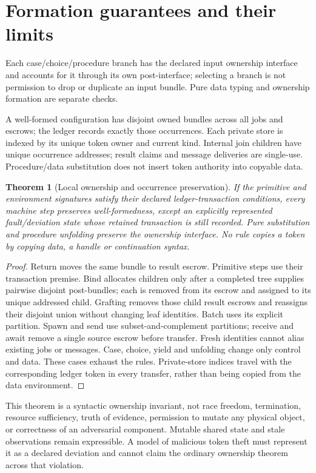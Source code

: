 \documentclass[11pt]{article}
\newtheorem{theorem}{Theorem}\newtheorem{definition}{Definition}\newtheorem{proposition}{Proposition}
\begin{document}
\section{Formation guarantees and their limits}
Each case/choice/procedure branch has the declared input ownership interface and accounts for it through its own post-interface; selecting a branch is not permission to drop or duplicate an input bundle. Pure data typing and ownership formation are separate checks.

A well-formed configuration has disjoint owned bundles across all jobs and escrows; the ledger records exactly those occurrences. Each private store is indexed by its unique token owner and current kind. Internal join children have unique occurrence addresses; result claims and message deliveries are single-use. Procedure/data substitution does not insert token authority into copyable data.

\begin{theorem}[Local ownership and occurrence preservation]
If the primitive and environment signatures satisfy their declared ledger-transaction conditions, every machine step preserves well-formedness, except an explicitly represented fault/deviation state whose retained transaction is still recorded. Pure substitution and procedure unfolding preserve the ownership interface. No rule copies a token by copying data, a handle or continuation syntax.
\end{theorem}
\begin{proof}
Return moves the same bundle to result escrow. Primitive steps use their transaction premise. Bind allocates children only after a completed tree supplies pairwise disjoint post-bundles; each is removed from its escrow and assigned to its unique addressed child. Grafting removes those child result escrows and reassigns their disjoint union without changing leaf identities. Batch uses its explicit partition. Spawn and send use subset-and-complement partitions; receive and await remove a single source escrow before transfer. Fresh identities cannot alias existing jobs or messages. Case, choice, yield and unfolding change only control and data. These cases exhaust the rules. Private-store indices travel with the corresponding ledger token in every transfer, rather than being copied from the data environment.
\end{proof}

This theorem is a syntactic ownership invariant, not race freedom, termination, resource sufficiency, truth of evidence, permission to mutate any physical object, or correctness of an adversarial component. Mutable shared state and stale observations remain expressible. A model of malicious token theft must represent it as a declared deviation and cannot claim the ordinary ownership theorem across that violation.
\end{document}
